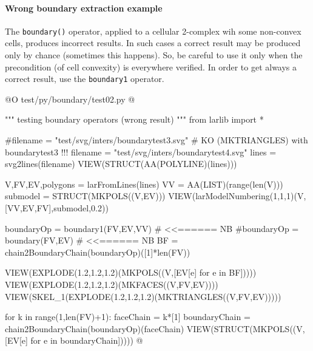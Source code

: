\documentclass[11pt,oneside]{article}	%
\begin{document}
\paragraph{Wrong boundary extraction example}

The \texttt{boundary()} operator, applied  to a cellular 2-complex wih some non-convex cells, produces incorrect results. In such cases a correct result may be produced only by chance (sometimes this happens). So, be careful to use it only when the precondition (of cell convexity) is everywhere verified. In order to get always a correct result, use the \texttt{boundary1} operator.

@O test/py/boundary/test02.py
@{""" testing boundary operators (wrong result) """
from larlib import *

#filename = "test/svg/inters/boundarytest3.svg" # KO (MKTRIANGLES) with boundarytest3 !!!
filename = "test/svg/inters/boundarytest4.svg"
lines = svg2lines(filename)
VIEW(STRUCT(AA(POLYLINE)(lines)))
    
V,FV,EV,polygons = larFromLines(lines)
VV = AA(LIST)(range(len(V)))
submodel = STRUCT(MKPOLS((V,EV)))
VIEW(larModelNumbering(1,1,1)(V,[VV,EV,FV],submodel,0.2))

boundaryOp = boundary1(FV,EV,VV)  # <<======  NB
#boundaryOp = boundary(FV,EV)  # <<======  NB
BF = chain2BoundaryChain(boundaryOp)([1]*len(FV))

VIEW(EXPLODE(1.2,1.2,1.2)(MKPOLS((V,[EV[e] for e in BF])))) 
VIEW(EXPLODE(1.2,1.2,1.2)(MKFACES((V,FV,EV)))) 
VIEW(SKEL_1(EXPLODE(1.2,1.2,1.2)(MKTRIANGLES((V,FV,EV))))) 

for k in range(1,len(FV)+1):
    faceChain = k*[1]
    boundaryChain = chain2BoundaryChain(boundaryOp)(faceChain)
    VIEW(STRUCT(MKPOLS((V,[EV[e] for e in boundaryChain]))))
@}
\end{document}
